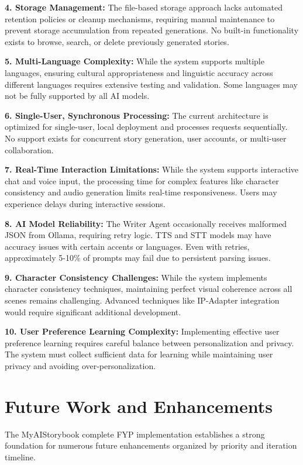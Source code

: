 \textbf{4. Storage Management:} The file-based storage approach lacks automated retention policies or cleanup mechanisms, requiring manual maintenance to prevent storage accumulation from repeated generations. No built-in functionality exists to browse, search, or delete previously generated stories.

\textbf{5. Multi-Language Complexity:} While the system supports multiple languages, ensuring cultural appropriateness and linguistic accuracy across different languages requires extensive testing and validation. Some languages may not be fully supported by all AI models.

\textbf{6. Single-User, Synchronous Processing:} The current architecture is optimized for single-user, local deployment and processes requests sequentially. No support exists for concurrent story generation, user accounts, or multi-user collaboration.

\textbf{7. Real-Time Interaction Limitations:} While the system supports interactive chat and voice input, the processing time for complex features like character consistency and audio generation limits real-time responsiveness. Users may experience delays during interactive sessions.

\textbf{8. AI Model Reliability:} The Writer Agent occasionally receives malformed JSON from Ollama, requiring retry logic. TTS and STT models may have accuracy issues with certain accents or languages. Even with retries, approximately 5-10\% of prompts may fail due to persistent parsing issues.

\textbf{9. Character Consistency Challenges:} While the system implements character consistency techniques, maintaining perfect visual coherence across all scenes remains challenging. Advanced techniques like IP-Adapter integration would require significant additional development.

\textbf{10. User Preference Learning Complexity:} Implementing effective user preference learning requires careful balance between personalization and privacy. The system must collect sufficient data for learning while maintaining user privacy and avoiding over-personalization.

\section{Future Work and Enhancements}
The MyAIStorybook complete FYP implementation establishes a strong foundation for numerous future enhancements organized by priority and iteration timeline.

